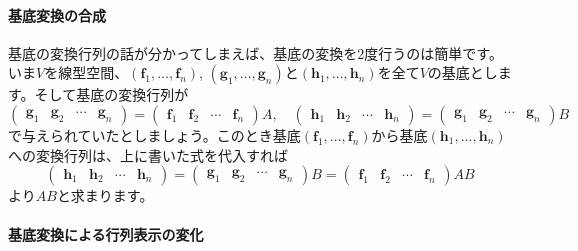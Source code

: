 \paragraph{基底変換の合成} 基底の変換行列の話が分かってしまえば、基底の変換を$2$度行うのは簡単です。いま$V$を線型空間、$(\bm{f}_1, \ldots, \bm{f}_n)$, $(\bm{g}_1, \ldots, \bm{g}_n)$と$(\bm{h}_1, \ldots, \bm{h}_n)$を全て$V$の基底とします。そして基底の変換行列が
\[
\begin{pmatrix}
\bm{g}_1 & \bm{g}_2 & \cdots & \bm{g}_n
\end{pmatrix}
=
\begin{pmatrix}
\bm{f}_1 & \bm{f}_2 & \cdots & \bm{f}_n
\end{pmatrix} A, \quad
\begin{pmatrix}
\bm{h}_1 & \bm{h}_2 & \cdots & \bm{h}_n
\end{pmatrix}
=
\begin{pmatrix}
\bm{g}_1 & \bm{g}_2 & \cdots & \bm{g}_n
\end{pmatrix} B
\]
で与えられていたとしましょう。このとき基底$(\bm{f}_1, \ldots, \bm{f}_n)$から基底$(\bm{h}_1, \ldots, \bm{h}_n)$への変換行列は、上に書いた式を代入すれば
\[
\begin{pmatrix}
\bm{h}_1 & \bm{h}_2 & \cdots & \bm{h}_n
\end{pmatrix}
=
\begin{pmatrix}
\bm{g}_1 & \bm{g}_2 & \cdots & \bm{g}_n
\end{pmatrix} B
=
\begin{pmatrix}
\bm{f}_1 & \bm{f}_2 & \cdots & \bm{f}_n
\end{pmatrix} AB
\]
より$AB$と求まります。

\paragraph{基底変換による行列表示の変化}

